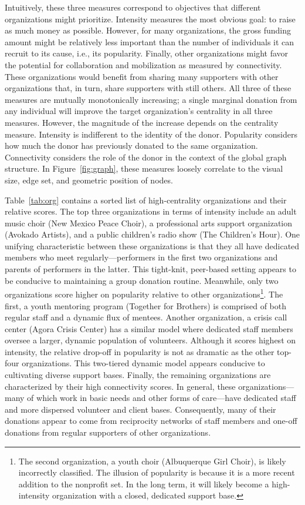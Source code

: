 Intuitively, these three measures correspond to objectives that different organizations might prioritize.
Intensity measures the most obvious goal: to raise as much money as possible.
However, for many organizations, the gross funding amount might be relatively less important than the number of individuals it can recruit to its cause, i.e., its popularity.  
Finally, other organizations might favor the potential for collaboration and mobilization as measured by connectivity.
These organizations would benefit from sharing many supporters with other organizations that, in turn, share supporters with still others.
All three of these measures are mutually monotonically increasing; a single marginal donation from any individual will improve the target organization's centrality in all three measures.
However, the magnitude of the increase depends on the centrality measure.
Intensity is indifferent to the identity of the donor.
Popularity considers how much the donor has previously donated to the same organization.
Connectivity considers the role of the donor in the context of the global graph structure.
In Figure~\ref{fig:graph}, these measures loosely correlate to the visual size, edge set, and geometric position of nodes.

Table~\ref{tab:org} contains a sorted list of high-centrality organizations and their relative scores.
The top three organizations in terms of intensity include an adult music choir (New Mexico Peace Choir), a professional arts support organization (Avokado Artists), and a public children's radio show (The Children's Hour).
One unifying characteristic between these organizations is that they all have dedicated members who meet regularly---performers in the first two organizations and parents of performers in the latter. 
This tight-knit, peer-based setting appears to be conducive to maintaining a group donation routine.
Meanwhile, only two organizations score higher on popularity relative to other organizations\footnote{The second organization, a youth choir (Albuquerque Girl Choir), is likely incorrectly classified.
The illusion of popularity is because it is a more recent addition to the nonprofit set. In the long term, it will likely become a high-intensity organization with a closed, dedicated support base.}.
The first, a youth mentoring program (Together for Brothers) is comprised of both regular staff and a dynamic flux of mentees.
Another organization, a crisis call center (Agora Crisis Center) has a similar model where dedicated staff members oversee a larger, dynamic population of volunteers.
Although it scores highest on intensity, the relative drop-off in popularity is not as dramatic as the other top-four organizations.
This two-tiered dynamic model appears conducive to cultivating diverse support bases.
Finally, the remaining organizations are characterized by their high connectivity scores.
In general, these organizations---many of which work in basic needs and other forms of care---have dedicated staff and more dispersed volunteer and client bases.
Consequently, many of their donations appear to come from reciprocity networks of staff members and one-off donations from regular supporters of other organizations.

